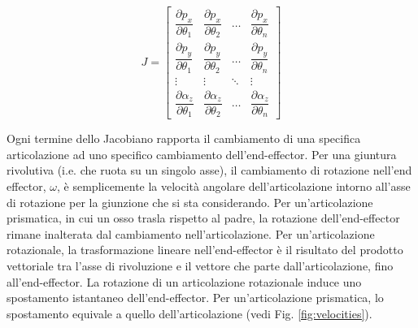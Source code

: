 \begin{equation}\label{eq:Jacobian}
    J=
    \begin{bmatrix}
        \dfrac{\partial p_x}{\partial \theta_1} & \dfrac{\partial p_x}{\partial \theta_2} & \dots & \dfrac{\partial p_x}{\partial \theta_n} \\[2ex]
        \dfrac{\partial p_y}{\partial \theta_1} & \dfrac{\partial p_y}{\partial \theta_2} & \dots & \dfrac{\partial p_y}{\partial \theta_n} \\[2ex]
        \vdots & \vdots & \ddots & \vdots \\[2ex]
        \dfrac{\partial \alpha_z}{\partial \theta_1} & \dfrac{\partial \alpha_z}{\partial \theta_2} & \dots & \dfrac{\partial \alpha_z}{\partial \theta_n} 
    \end{bmatrix}
\end{equation}

Ogni termine dello Jacobiano rapporta il cambiamento di una specifica articolazione ad uno specifico cambiamento dell'end-effector.
Per una giuntura rivolutiva (i.e. che ruota su un singolo asse), il cambiamento di rotazione nell'end effector, $\omega$, è semplicemente la velocità angolare dell'articolazione intorno all'asse di rotazione per la giunzione che si sta considerando.
Per un'articolazione prismatica, in cui un osso trasla rispetto al padre, la rotazione dell'end-effector rimane inalterata dal cambiamento nell'articolazione.
Per un'articolazione rotazionale, la trasformazione lineare nell'end-effector è il risultato del prodotto vettoriale tra l'asse di rivoluzione e il vettore che parte dall'articolazione, fino all'end-effector.
La rotazione di un articolazione rotazionale induce uno spostamento istantaneo dell'end-effector.
Per un'articolazione prismatica, lo spostamento equivale a quello dell'articolazione (vedi Fig. \ref{fig:velocities}).

